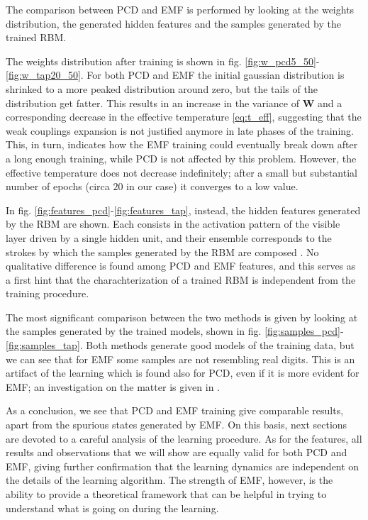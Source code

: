 \documentclass[notitlepage]{revtex4-1}
\begin{document}
The comparison between PCD and EMF is performed by looking at the weights distribution, the generated hidden features and the samples generated by the trained RBM.

The weights distribution after training is shown in fig. \ref{fig:w_pcd5_50}-\ref{fig:w_tap20_50}. For both PCD and EMF the initial gaussian distribution is shrinked to a more peaked distribution around zero, but the tails of the distribution get fatter. This results in an increase in the variance of \(\mathbf{W}\) and a corresponding decrease in the effective temperature \eqref{eq:t_eff}, suggesting that the weak couplings expansion is not justified anymore in late phases of the training. This, in turn, indicates how the EMF training could eventually break down after a long enough training, while PCD is not affected by this problem. However, the effective temperature does not decrease indefinitely; after a small but substantial number of epochs (circa \(20\) in our case) it converges to a low value.

In fig. \ref{fig:features_pcd}-\ref{fig:features_tap}, instead, the hidden features generated by the RBM are shown. Each consists in the activation pattern of the visible layer driven by a single hidden unit, and their ensemble corresponds to the strokes by which the samples generated by the RBM are composed \cite{monasson}. No qualitative difference is found among PCD and EMF features, and this serves as a first hint that the charachterization of a trained RBM is independent from the training procedure. 

The most significant comparison between the two methods is given by looking at the samples generated by the trained models, shown in fig. \ref{fig:samples_pcd}-\ref{fig:samples_tap}. Both methods generate good models of the training data, but we can see that for EMF some samples are not resembling real digits. This is an artifact of the learning which is found also for PCD, even if it is more evident for EMF; an investigation on the matter is given in \cite{leroy}\cite{tap}.

As a conclusion, we see that PCD and EMF training give comparable results, apart from the spurious states generated by EMF. On this basis, next sections are devoted to a careful analysis of the learning procedure. As for the features, all results and observations that we will show are equally valid for both PCD and EMF, giving further confirmation that the learning dynamics are independent on the details of the learning algorithm. The strength of EMF, however, is the ability to provide a theoretical framework that can be helpful in trying to understand what is going on during the learning.
\end{document}
